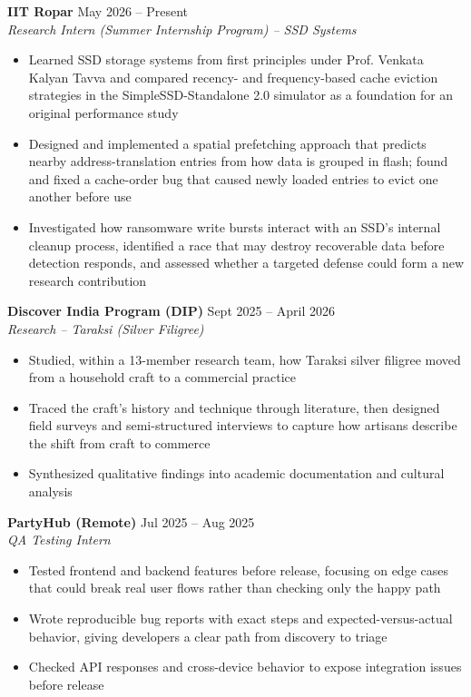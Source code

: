 \documentclass[10pt,a4paper]{article}
\newcommand{\experience}[4]{
    \textbf{#1} \hfill #2\\
    \textit{#3} \hfill #4\\[0.1em]
}
\begin{document}
\experience{IIT Ropar}{May 2026 -- Present}{Research Intern (Summer Internship Program) -- SSD Systems}{}
\begin{itemize}[leftmargin=*, itemsep=0pt, parsep=0pt, topsep=1pt]
    \item Learned SSD storage systems from first principles under Prof. Venkata Kalyan Tavva and compared recency- and frequency-based cache eviction strategies in the SimpleSSD-Standalone 2.0 simulator as a foundation for an original performance study
    \item Designed and implemented a spatial prefetching approach that predicts nearby address-translation entries from how data is grouped in flash; found and fixed a cache-order bug that caused newly loaded entries to evict one another before use
    \item Investigated how ransomware write bursts interact with an SSD's internal cleanup process, identified a race that may destroy recoverable data before detection responds, and assessed whether a targeted defense could form a new research contribution
\end{itemize}

\experience{Discover India Program (DIP)}{Sept 2025 -- April 2026}{Research -- Taraksi (Silver Filigree)}{}
\begin{itemize}[leftmargin=*, itemsep=0pt, parsep=0pt, topsep=1pt]
    \item Studied, within a 13-member research team, how Taraksi silver filigree moved from a household craft to a commercial practice
    \item Traced the craft's history and technique through literature, then designed field surveys and semi-structured interviews to capture how artisans describe the shift from craft to commerce
    \item Synthesized qualitative findings into academic documentation and cultural analysis
\end{itemize}

\experience{PartyHub (Remote)}{Jul 2025 -- Aug 2025}{QA Testing Intern}{}
\begin{itemize}[leftmargin=*, itemsep=0pt, parsep=0pt, topsep=1pt]
    \item Tested frontend and backend features before release, focusing on edge cases that could break real user flows rather than checking only the happy path
    \item Wrote reproducible bug reports with exact steps and expected-versus-actual behavior, giving developers a clear path from discovery to triage
    \item Checked API responses and cross-device behavior to expose integration issues before release
\end{itemize}
\end{document}
